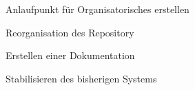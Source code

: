 \begin{frame}

\begin{block}{}
	Anlaufpunkt für Organisatorisches erstellen
\end{block}
\begin{block}{}
	Reorganisation des Repository
\end{block}
\begin{block}{}
	Erstellen einer Dokumentation
\end{block}
\begin{block}{}
	Stabilisieren des bisherigen Systems
\end{block}
\end{frame}